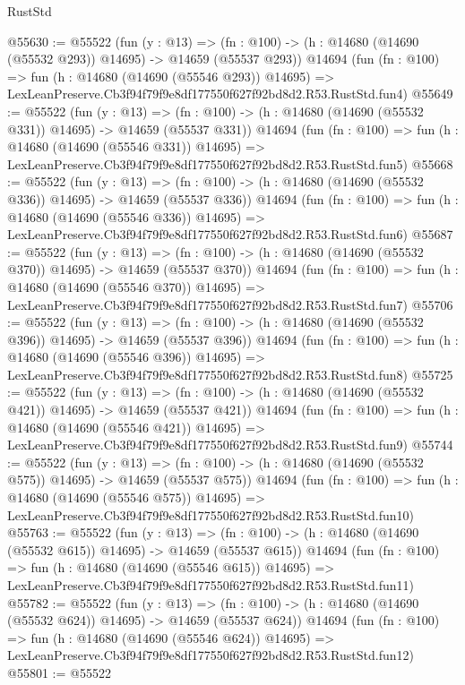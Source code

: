\begin{lexlean}{RustStd}
\begin{coremodule}
@55630 := @55522
    (fun (y : @13) =>
    (fn : @100) -> (h : @14680 (@14690 (@55532 @293)) @14695) -> @14659 (@55537 @293))
    @14694
    (fun (fn : @100) =>
    fun (h : @14680 (@14690 (@55546 @293)) @14695) =>
    LexLeanPreserve.Cb3f94f79f9e8df177550f627f92bd8d2.R53.RustStd.fun4)
@55649 := @55522
    (fun (y : @13) =>
    (fn : @100) -> (h : @14680 (@14690 (@55532 @331)) @14695) -> @14659 (@55537 @331))
    @14694
    (fun (fn : @100) =>
    fun (h : @14680 (@14690 (@55546 @331)) @14695) =>
    LexLeanPreserve.Cb3f94f79f9e8df177550f627f92bd8d2.R53.RustStd.fun5)
@55668 := @55522
    (fun (y : @13) =>
    (fn : @100) -> (h : @14680 (@14690 (@55532 @336)) @14695) -> @14659 (@55537 @336))
    @14694
    (fun (fn : @100) =>
    fun (h : @14680 (@14690 (@55546 @336)) @14695) =>
    LexLeanPreserve.Cb3f94f79f9e8df177550f627f92bd8d2.R53.RustStd.fun6)
@55687 := @55522
    (fun (y : @13) =>
    (fn : @100) -> (h : @14680 (@14690 (@55532 @370)) @14695) -> @14659 (@55537 @370))
    @14694
    (fun (fn : @100) =>
    fun (h : @14680 (@14690 (@55546 @370)) @14695) =>
    LexLeanPreserve.Cb3f94f79f9e8df177550f627f92bd8d2.R53.RustStd.fun7)
@55706 := @55522
    (fun (y : @13) =>
    (fn : @100) -> (h : @14680 (@14690 (@55532 @396)) @14695) -> @14659 (@55537 @396))
    @14694
    (fun (fn : @100) =>
    fun (h : @14680 (@14690 (@55546 @396)) @14695) =>
    LexLeanPreserve.Cb3f94f79f9e8df177550f627f92bd8d2.R53.RustStd.fun8)
@55725 := @55522
    (fun (y : @13) =>
    (fn : @100) -> (h : @14680 (@14690 (@55532 @421)) @14695) -> @14659 (@55537 @421))
    @14694
    (fun (fn : @100) =>
    fun (h : @14680 (@14690 (@55546 @421)) @14695) =>
    LexLeanPreserve.Cb3f94f79f9e8df177550f627f92bd8d2.R53.RustStd.fun9)
@55744 := @55522
    (fun (y : @13) =>
    (fn : @100) -> (h : @14680 (@14690 (@55532 @575)) @14695) -> @14659 (@55537 @575))
    @14694
    (fun (fn : @100) =>
    fun (h : @14680 (@14690 (@55546 @575)) @14695) =>
    LexLeanPreserve.Cb3f94f79f9e8df177550f627f92bd8d2.R53.RustStd.fun10)
@55763 := @55522
    (fun (y : @13) =>
    (fn : @100) -> (h : @14680 (@14690 (@55532 @615)) @14695) -> @14659 (@55537 @615))
    @14694
    (fun (fn : @100) =>
    fun (h : @14680 (@14690 (@55546 @615)) @14695) =>
    LexLeanPreserve.Cb3f94f79f9e8df177550f627f92bd8d2.R53.RustStd.fun11)
@55782 := @55522
    (fun (y : @13) =>
    (fn : @100) -> (h : @14680 (@14690 (@55532 @624)) @14695) -> @14659 (@55537 @624))
    @14694
    (fun (fn : @100) =>
    fun (h : @14680 (@14690 (@55546 @624)) @14695) =>
    LexLeanPreserve.Cb3f94f79f9e8df177550f627f92bd8d2.R53.RustStd.fun12)
@55801 := @55522

\end{coremodule}
\end{lexlean}
